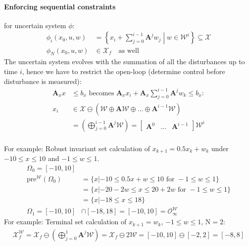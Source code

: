 \documentclass[landscape,a4paper,8pt]{scrartcl}
\newcommand{\mc}[1]{\mathcal{#1}}
\newcommand\vA{\bm{A}}
\newcommand{\Me}[1]{\begin{bmatrix}#1\end{bmatrix}} %
\begin{document}
\begin{multicols*}{3}
\paragraph{Enforcing sequential constraints} for uncertain system $\phi$:\\
\begin{align*}
\phi_i(x_0, u, w) & = \left\{ x_i + \sum_{j=0}^{i-1}\vA^j w_j \middle| w \in \mc W^i \right\} \subseteq \mc X \\
\phi_N(x_0, u, w) & \in \mc X_f \quad\text{as well}
\end{align*}
The uncertain system evolves with the summation of all the disturbances up to time $i$, hence we have to restrict the open-loop (determine control before disturbance is measured):
\begin{align*}
\vA_x x & \leq b_x \text{ becomes } \vA_x x_i + \vA_x \sum_{j=0}^{i-1}\vA^j w_k \leq b_x: \\
x_i & \in \mc X \ominus \left(\mc W \oplus \vA\mc W \oplus \dots \oplus \vA^{i-1}\mc W\right) \\
    & = \left(\bigoplus_{j=0}^{i-1}\vA^j\mc W\right) = \Me{\vA^0 & \dots & \vA^{i-1}}\mc W^i \\
\end{align*}

For example: Robust invariant set calculation of $x_{k+1} = 0.5x_k + w_k$ under $-10 \le x \le 10$ and $-1 \le w \le 1$.
\begin{align*}
\Omega_0 = [-10, 10] \\
	\text{pre}^\mc{W} (\Omega_0) &= \{x | -10 \le 0.5x + w \le 10 \text{ for } -1 \le w \le 1 \} \\
	&= \{x | -20 -2w \le x \le 20 + 2w \text{ for } -1 \le w \le 1 \} \\
	&= \{x | -18 \le x \le 18 \}\\
		\Omega_1 = [-10, 10] &\cap [-18, 18] = [-10, 10] = \mc O_\infty^{\mc W}
\end{align*}
For example: Terminal set calculation of $x_{k+1} = w_k$, $-1 \le w \le 1$, N$= 2$:
\begin{align*}
 \mc X_f^\mc W =  \mc X_f \ominus \left(\bigoplus_{j=0}^{1}\vA^j\mc W\right) = \mc X_f \ominus 2 \mc W = [-10, 10] \ominus [-2, 2] = [-8, 8]
\end{align*}

\end{multicols*}
\end{document}
